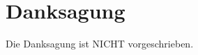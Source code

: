 \chapter*{Danksagung}
\thispagestyle{plain}
\pagestyle{plain}

Die Danksagung ist NICHT vorgeschrieben.


\newpage